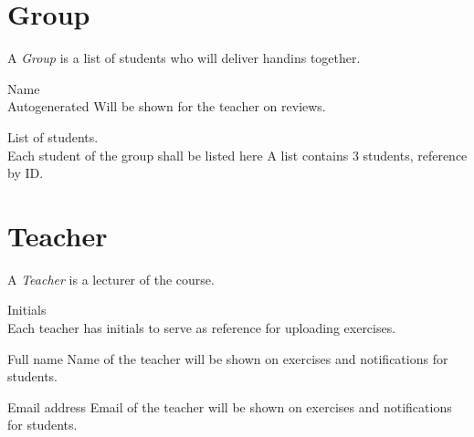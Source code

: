 \documentclass[Main]{subfiles}
\begin{document}

\section{Group}
A \textit{Group} is a list of students who will deliver handins together.
\begin{DataIntro}
\rExample{}
\end{DataIntro}

\begin{DataTable}

\Record
{Name\\
Autogenerated}
{Will be shown for the teacher on reviews.}
{}


\Record
{List of students.\\
Each student of the group shall be listed here}
{A list contains 3 students, reference by ID.}
{}


\end{DataTable}





\section{Teacher}
A \textit{Teacher} is a lecturer of the course.

\begin{DataIntro}
\rExample{}
\end{DataIntro}

\begin{DataTable}

\Record
{Initials\\
Each teacher has initials to serve as reference for uploading exercises.}
{}
{}

\Record
{Full name}
{Name of the teacher will be shown on exercises and notifications for students.}
{}

\Record
{Email address}
{Email of the teacher will be shown on exercises and notifications for students.}
{}

\end{DataTable}
\end{document}
